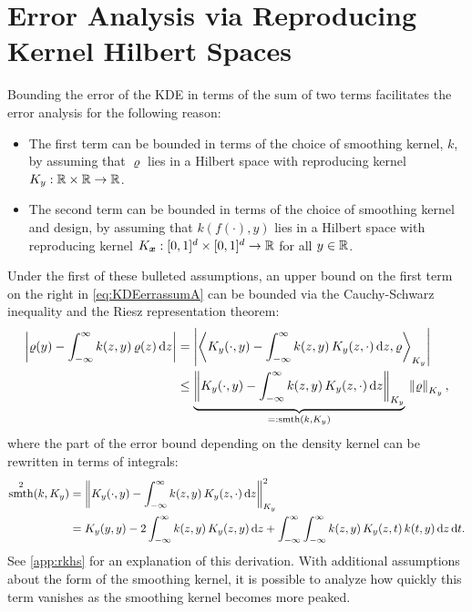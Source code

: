 \documentclass[letterpaper]{amsart}
\newcommand{\KY}{K_y}
\newcommand{\KX}{{K_{\vx}}}
\DeclareMathOperator{\smooth}{smth}
\begin{document}
\section{Error Analysis via Reproducing Kernel Hilbert Spaces}\label{sec:error_analysis}
Bounding the error of the KDE in terms of the sum of two terms facilitates the error analysis for the following reason:
\begin{itemize}
	\item The first term can be bounded in terms of the choice of smoothing kernel, $k$, by assuming that $\varrho$ lies in a Hilbert space with reproducing kernel $\KY:\reals \times \reals \to \reals$.

	\item The second term can be bounded in terms of the choice of smoothing kernel and design, by assuming that $k(f(\cdot),y)$  lies in a Hilbert space with reproducing kernel $\KX: [0,1]^d \times [0,1]^d\to \reals$ for all $y \in \mathbb{R}$.
\end{itemize}

Under the first of these bulleted assumptions, an upper bound on the first term on the right in \eqref{eq:KDEerrassumA} can be bounded via the Cauchy-Schwarz inequality and the Riesz representation theorem:
\begin{align}
\label{eq:firstbd}
\abs{\varrho(y) - \int_{-\infty}^{\infty} k(z,y) \, \varrho(z) \, \dif z}
& = \abs{\ip[\KY]{\KY(\cdot,y) - \int_{-\infty}^{\infty} k(z,y) \, \KY(z,\cdot) \,  \dif z}{\varrho} } \\
\nonumber
& \le  \underbrace{\norm[\KY]{\KY(\cdot,y) - \int_{-\infty}^{\infty} k(z,y) \, \KY(z,\cdot) \, \dif z}}_{=: \smooth(k,\KY)} \, \norm[\KY]{\varrho},
\end{align}
where the part of the error bound depending on the density kernel can be rewritten in terms of integrals:
\begin{align}
\label{eq:kquality}
\smooth^2(k,\KY) &= \norm[\KY]{\KY(\cdot,y) - \int_{-\infty}^{\infty} k(z,y) \, \KY(z,\cdot) \, \dif z}^2 \\
\nonumber
&=  \KY(y,y) - 2 \int_{-\infty}^{\infty} k(z,y) \, \KY(z,y) \, \dif z  + \int_{-\infty}^{\infty} \int_{-\infty}^{\infty}  k(z,y) \, \KY(z,t) \, k(t,y)\, \dif z \, \dif t.
\end{align}
See \cref{app:rkhs} for an explanation of this derivation.  With additional assumptions about the form of the smoothing kernel, it is possible to analyze how quickly this term vanishes as the smoothing kernel becomes more peaked.
\end{document}
